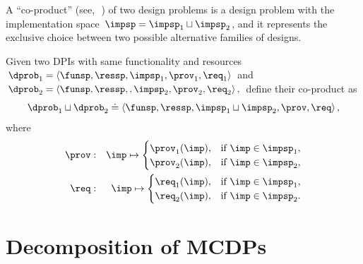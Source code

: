 A ``co-product'' (see,~\eg\,\cite[Section 2.4]{spivak14category})
of two design problems is a design problem with the implementation
space~$\impsp=\impsp_{1}\sqcup\impsp_{2}$, and it represents the
exclusive choice between two possible alternative families of designs.
\begin{definition}[Co-product]
\label{def:parallel-1}Given two DPIs with same functionality and
resources $\dprob_{1}=\left\langle \funsp,\ressp,\impsp_{1},\prov_{1},\req_{1}\right\rangle $
and $\dprob_{2}=\left\langle \funsp,\ressp,,\impsp_{2},\prov_{2},\req_{2}\right\rangle ,$
define their co-product as
\[
\dprob_{1}\sqcup\dprob_{2}\doteq\left\langle \funsp,\ressp,\impsp_{1}\sqcup\impsp_{2},\prov,\req\right\rangle ,
\]
where
\begin{eqnarray}
\prov & : & \imp\mapsto\begin{cases}
\prov_{1}(\imp), & \text{if }\imp\in\impsp_{1},\\
\prov_{2}(\imp), & \text{if }\imp\in\impsp_{2},
\end{cases}\label{eq:dppar-exec-1}\\
\req & : & \imp\mapsto\begin{cases}
\req_{1}(\imp), & \text{if }\imp\in\impsp_{1},\\
\req_{2}(\imp), & \text{if }\imp\in\impsp_{2}.
\end{cases}\nonumber
\end{eqnarray}

\end{definition}

\section{Decomposition of MCDPs\label{sec:Decomposition}}

